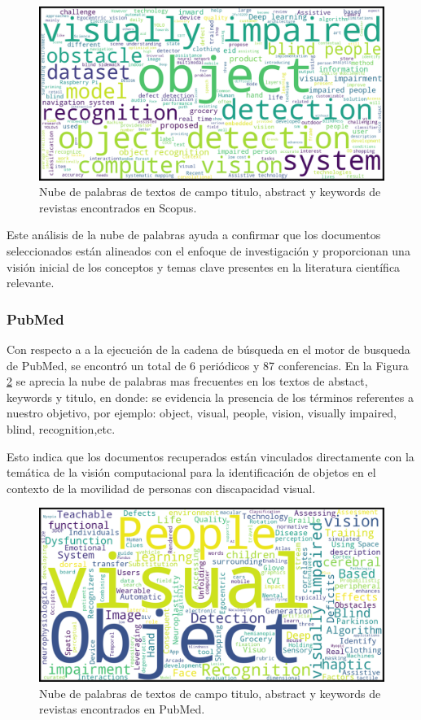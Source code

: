 \documentclass[letterpaper]{article}
\begin{document}
    	\begin{figure}[H]
    		\centering
    		\includegraphics[width=1\columnwidth]{graficos/Scopus-nube.png}
    		\caption{Nube de palabras de textos de campo titulo, abstract y keywords de revistas encontrados en Scopus.}
    		\label{cloud_w1}
    	\end{figure}

Este análisis de la nube de palabras ayuda a confirmar que los documentos seleccionados están alineados con el enfoque de investigación y proporcionan una visión inicial de los conceptos y temas clave presentes en la literatura científica relevante.

	    \subsubsection{PubMed}
    Con respecto a a la ejecución de la cadena de búsqueda en el motor de busqueda de PubMed, se encontró un total de 6 periódicos y 87 conferencias.
En la Figura \ref{cloud_w2} se aprecia la nube de palabras mas frecuentes en los textos de abstact, keywords y titulo, en donde: se evidencia la presencia de los términos referentes a nuestro objetivo, por ejemplo: object, visual, people, vision, visually impaired, blind, recognition,etc. 

Esto indica que los documentos recuperados están vinculados directamente con la temática de la visión computacional para la identificación de objetos en el contexto de la movilidad de personas con discapacidad visual.

    	\begin{figure}[H]
    		\centering
    		\includegraphics[width=1\columnwidth]{graficos/PubMed-nube.png}
    		\caption{Nube de palabras de textos de campo titulo, abstract y keywords de revistas encontrados en PubMed.}
    		\label{cloud_w2}
    	\end{figure}
\end{document}

